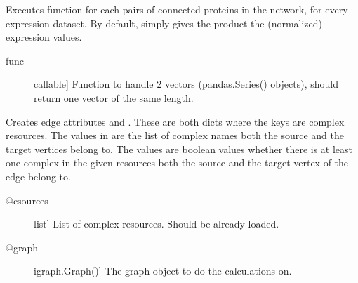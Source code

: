 \documentclass[letterpaper,10pt,english]{sphinxmanual}
\begin{document}
\begin{fulllineitems}
\begin{fulllineitems}
\label{\detokenize{main:pypath.main.PyPath.edges_expression}}
Executes function  for each pairs of connected proteins in the
network, for every expression dataset. By default,  simply
gives the product the (normalized) expression values.
\begin{description}
\item[{func}] \leavevmode{[}callable{]}
Function to handle 2 vectors (pandas.Series() objects), should
return one vector of the same length.

\end{description}

\end{fulllineitems}


\begin{fulllineitems}
\label{\detokenize{main:pypath.main.PyPath.edges_in_comlexes}}
Creates edge attributes  and .
These are both dicts where the keys are complex resources.
The values in  are the list of complex names
both the source and the target vertices belong to.
The values  are boolean values whether there
is at least one complex in the given resources both the
source and the target vertex of the edge belong to.
\begin{description}
\item[{@csources}] \leavevmode{[}list{]}
List of complex resources. Should be already loaded.

\item[{@graph}] \leavevmode{[}igraph.Graph(){]}
The graph object to do the calculations on.

\end{description}

\end{fulllineitems}


\begin{fulllineitems}
\label{\detokenize{main:pypath.main.PyPath.edges_ptms}}
\end{fulllineitems}


\end{fulllineitems}
\end{document}

